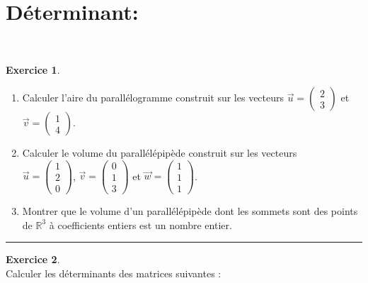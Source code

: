\documentclass[a4paper,10pt]{article}
\theoremstyle{definition}
\theoremstyle{definition}
\newtheorem{exo}{Exercice}
\newcommand{\R}{\mathbb{R}}
\begin{document}
\section*{Déterminant:}\hfill\\
\begin{minipage}{1\linewidth}
	\begin{minipage}[t]{0.48\linewidth}
		\raggedright
		
		
		
		\begin{exo}\quad\\
			\begin{enumerate}
				\item Calculer l'aire du parall\'elogramme construit sur les vecteurs 
				$\vec{u} = \left(\begin{array}{c}2\\3\end{array}\right)$ et 
				$\vec{v} = \left(\begin{array}{c}1\\4\end{array}\right)$.
				\item Calculer le volume du  parall\'el\'epip\`ede construit sur les vecteurs \\
				$\vec{u} = \left(\begin{array}{c}1\\2\\0\end{array}\right)$, 
				$\vec{v} = \left(\begin{array}{c}0\\1\\3\end{array}\right)$ et 
				$\vec{w} = \left(\begin{array}{c}1\\1\\1\end{array}\right)$.
				\item Montrer que le volume d'un parall\'el\'epip\`ede dont les sommets sont des points de 
				$\R^3$ \`a coefficients entiers est un nombre entier.
			\end{enumerate}
			
			\centering
			\rule{1\linewidth}{0.6pt}
		\end{exo}
		
		
		
		\begin{exo}\quad\\
			Calculer les déterminants des matrices suivantes :
			

\end{exo}
\end{minipage}
\end{minipage}
\end{document}
